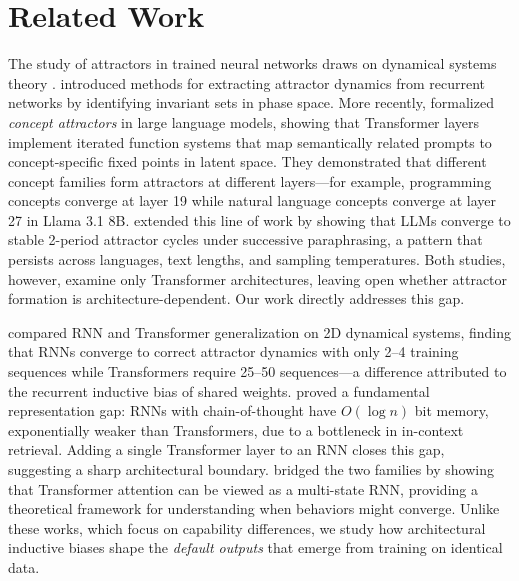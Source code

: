 \section{Related Work}
\label{sec:related}

The study of attractors in trained neural networks draws on dynamical systems theory \citep{strogatz2015nonlinear}. \citet{beer2018interpreting} introduced methods for extracting attractor dynamics from recurrent networks by identifying invariant sets in phase space. More recently, \citet{chytas2025concept} formalized \emph{concept attractors} in large language models, showing that Transformer layers implement iterated function systems that map semantically related prompts to concept-specific fixed points in latent space. They demonstrated that different concept families form attractors at different layers---for example, programming concepts converge at layer 19 while natural language concepts converge at layer 27 in Llama 3.1 8B. \citet{wang2025unveiling} extended this line of work by showing that LLMs converge to stable 2-period attractor cycles under successive paraphrasing, a pattern that persists across languages, text lengths, and sampling temperatures. Both studies, however, examine only Transformer architectures, leaving open whether attractor formation is architecture-dependent. Our work directly addresses this gap.

\citet{fukushima2023comparing} compared RNN and Transformer generalization on 2D dynamical systems, finding that RNNs converge to correct attractor dynamics with only 2--4 training sequences while Transformers require 25--50 sequences---a difference attributed to the recurrent inductive bias of shared weights. \citet{wen2024rnns} proved a fundamental representation gap: RNNs with chain-of-thought have $O(\log n)$ bit memory, exponentially weaker than Transformers, due to a bottleneck in in-context retrieval. Adding a single Transformer layer to an RNN closes this gap, suggesting a sharp architectural boundary. \citet{barak2024transformers} bridged the two families by showing that Transformer attention can be viewed as a multi-state RNN, providing a theoretical framework for understanding when behaviors might converge. Unlike these works, which focus on capability differences, we study how architectural inductive biases shape the \emph{default outputs} that emerge from training on identical data.

